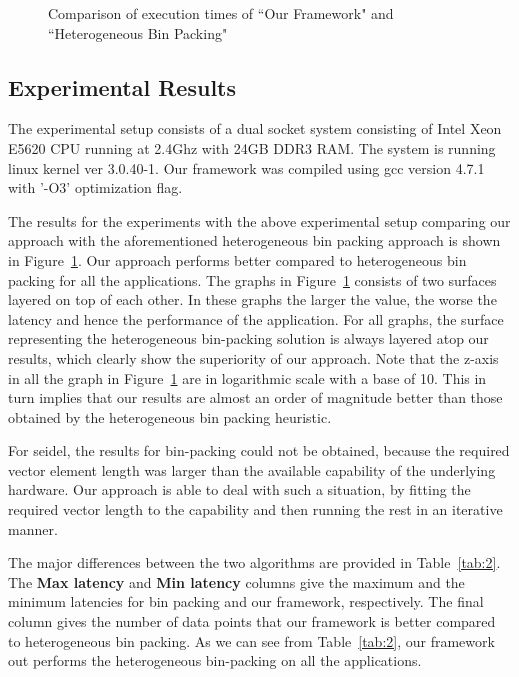 \begin{figure}[t!]
{    \label{fig:jacl1ho}
  }
  \caption{Comparison of execution times of ``Our Framework" and
    ``Heterogeneous Bin Packing"}
  \label{fig:ho}
\end{figure}

\subsection{Experimental Results}
\label{sec:results-1}

The experimental setup consists of a dual socket system consisting of
Intel Xeon E5620 CPU running at 2.4Ghz with 24GB DDR3 RAM. The system
is running linux kernel ver 3.0.40-1. Our framework was compiled
using gcc version 4.7.1 with '-O3' optimization flag.

The results for the experiments with the above experimental setup
comparing our approach with the aforementioned heterogeneous bin packing
approach is shown in Figure~\ref{fig:ho}. Our approach performs better
compared to heterogeneous bin packing for all the applications. The
graphs in Figure~\ref{fig:ho} consists of two surfaces layered on top of
each other. In these graphs the larger the value, the worse the latency
and hence the performance of the application. For all graphs, the
surface representing the heterogeneous bin-packing solution is always
layered atop our results, which clearly show the superiority of our
approach. Note that the z-axis in all the graph in Figure~\ref{fig:ho}
are in logarithmic scale with a base of 10. This in turn implies that
our results are almost an order of magnitude better than those obtained
by the heterogeneous bin packing heuristic.

For seidel, the results for bin-packing could not be obtained, because
the required vector element length was larger than the available
capability of the underlying hardware. Our approach is able to deal with
such a situation, by fitting the required vector length to the
capability and then running the rest in an iterative manner.

The major differences between the two algorithms are provided in
Table~\ref{tab:2}. The \textbf{Max latency} and \textbf{Min latency}
columns give the maximum and the minimum latencies for bin packing and
our framework, respectively. The final column gives the number of data
points that our framework is better compared to heterogeneous bin
packing. As we can see from Table~\ref{tab:2}, our framework out
performs the heterogeneous bin-packing on all the applications.

